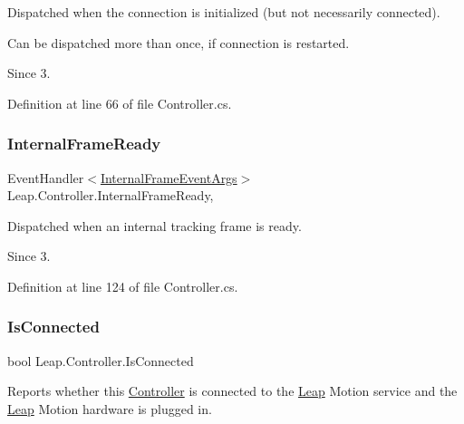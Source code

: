 Dispatched when the connection is initialized (but not necessarily connected). 

Can be dispatched more than once, if connection is restarted. \begin{DoxySince}{Since}
3. 
\end{DoxySince}


Definition at line 66 of file Controller.\+cs.

\mbox{\label{class_leap_1_1_controller_a0713d49768905ceba0ffb63ecc216aa1}} 
\subsubsection{\texorpdfstring{InternalFrameReady}{InternalFrameReady}}
{\footnotesize\ttfamily Event\+Handler$<$\mbox{\hyperlink{class_leap_1_1_internal_frame_event_args}{Internal\+Frame\+Event\+Args}}$>$ Leap.\+Controller.\+Internal\+Frame\+Ready\hspace{0.3cm}{\ttfamily [add]}, {\ttfamily [remove]}}



Dispatched when an internal tracking frame is ready. 

\begin{DoxySince}{Since}
3. 
\end{DoxySince}


Definition at line 124 of file Controller.\+cs.

\mbox{\label{class_leap_1_1_controller_aac7cccf354ef1a6f1f01222a9b63d8bd}} 
\subsubsection{\texorpdfstring{IsConnected}{IsConnected}}
{\footnotesize\ttfamily bool Leap.\+Controller.\+Is\+Connected\hspace{0.3cm}{\ttfamily [get]}}



Reports whether this \mbox{\hyperlink{class_leap_1_1_controller}{Controller}} is connected to the \mbox{\hyperlink{namespace_leap}{Leap}} Motion service and the \mbox{\hyperlink{namespace_leap}{Leap}} Motion hardware is plugged in. 

